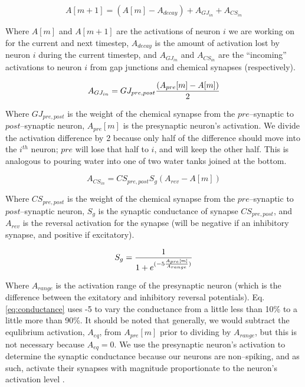 \documentclass[letterpaper]{article}
\begin{document}
\begin{equation}
    A[m+1] = (A[m] - A_{decay}) + A_{GJ_{in}} + A_{CS_{in}} 
\end{equation}

Where $A[m]$ and $A[m+1]$ are the activations of neuron $i$ we are working on for the current and next timestep, $A_{decay}$ is the amount of activation lost by neuron $i$ during the current timestep, and $A_{GJ_{in}}$ and $A_{CS_{in}}$ are the ``incoming'' activations to neuron $i$ from gap junctions and chemical synapses (respectively).

\begin{equation}
    A_{GJ_{in}} =  GJ_{pre,post} {(A_{pre}[m] - A[m]) \over 2}
\end{equation}

Where $GJ_{pre,post}$ is the weight of the chemical synapse from the $pre$--synaptic to $post$--synaptic neuron, $A_{pre}[m]$ is the presynaptic neuron's activation. We divide the activation difference by 2 because only half of the difference should move into the $i^{th}$ neuron; $pre$ will lose that half to $i$, and will keep the other half. This is analogous to pouring water into one of two water tanks joined at the bottom.

\begin{equation}
    A_{CS_{in}} =  CS_{pre,post} S_g  (A_{rev} - A[m])
\end{equation}

Where $CS_{pre,post}$ is the weight of the chemical synapse from the $pre$--synaptic to $post$--synaptic neuron, $S_g$ is the synaptic conductance of synapse $CS_{pre,post}$, and $A_{rev}$ is the reversal activation for the synapse (will be negative if an inhibitory synapse, and positive if excitatory).

\begin{equation}
    \label{eq:conductance}
    S_g = {1 \over { 1 + e^{(-5 { A_{pre}[m] \over A_{range} } )} }}
\end{equation}

Where $A_{range}$ is the activation range of the presynaptic neuron (which is the difference between the exitatory and inhibitory reversal potentials). Eq. \ref{eq:conductance} uses -5 to vary the conductance from a little less than 10\% to a little more than 90\%.
It should be noted that generally, we would subtract the equlibrium activation, $A_{eq}$, from $A_{pre}[m]$ prior to dividing by $A_{range}$, but this is not necessary because $A_{eq} = 0$.
We use the presynaptic neuron's activation to determine the synaptic conductance because our neurons are non--spiking, and as such, activate their synapses with magnitude  proportionate to the neuron's activation level \citep{Wicks1996}.
\end{document}
